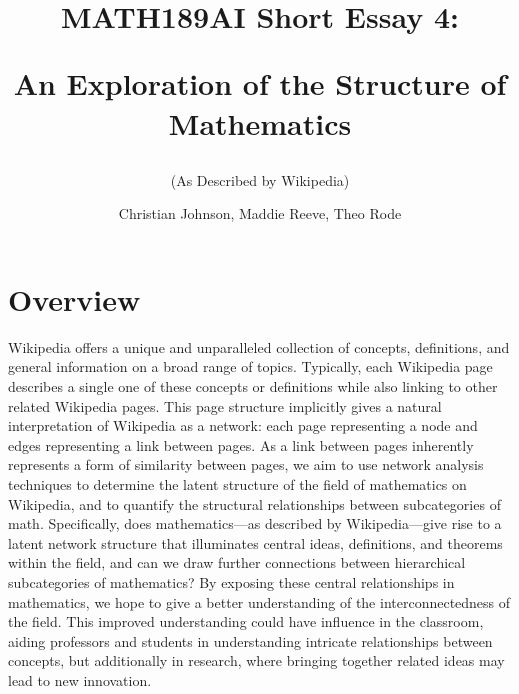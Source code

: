 \documentclass[10pt]{paper}
\begin{document}
\title{MATH189AI Short Essay 4: 

An Exploration of the Structure of Mathematics}
\subtitle{(As Described by Wikipedia)}
\author{Christian Johnson, Maddie Reeve, Theo Rode }



\maketitle

\section{Overview}

Wikipedia offers a unique and unparalleled collection of concepts, definitions, and general information on a broad range of topics. 
Typically, each Wikipedia page describes a single one of these concepts or definitions while also linking to other related Wikipedia pages. 
This page structure implicitly gives a natural interpretation of Wikipedia as a network: each page representing a node and edges representing a link between pages. 
As a link between pages inherently represents a form of similarity between pages, we aim to use network analysis techniques to determine the latent structure of the field of mathematics on Wikipedia, and to quantify the structural relationships between subcategories of math. 
Specifically, does mathematics---as described by Wikipedia---give rise to a latent network structure that illuminates central ideas, definitions, and theorems within the field, and can we draw further connections between hierarchical subcategories of mathematics?
By exposing these central relationships in mathematics, we hope to give a better understanding of the interconnectedness of the field. This improved understanding could have influence in the classroom, aiding professors and students in understanding intricate relationships between concepts, but additionally in research, where bringing together related ideas may lead to new innovation. 
\end{document}
